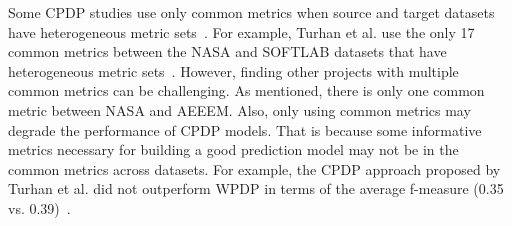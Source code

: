 Some CPDP studies use only common metrics when source and target datasets have
heterogeneous metric sets~\cite{Ma12,Turhan09}.
For example, Turhan et al. use the only 17 common metrics between the NASA and
SOFTLAB datasets that have heterogeneous metric sets~\cite{Turhan09}. However,
finding other projects with multiple common metrics can be challenging. As
mentioned, there is only one common metric between NASA and AEEEM. Also,
only using common metrics may degrade the performance of CPDP models.
That is because some informative metrics necessary for building a good prediction model may not
be in the common metrics across datasets. For example, the CPDP approach proposed by Turhan et al. did not
outperform WPDP in terms of the average
f-measure (0.35 vs. 0.39)~\cite{Turhan09}.

% 
% 



